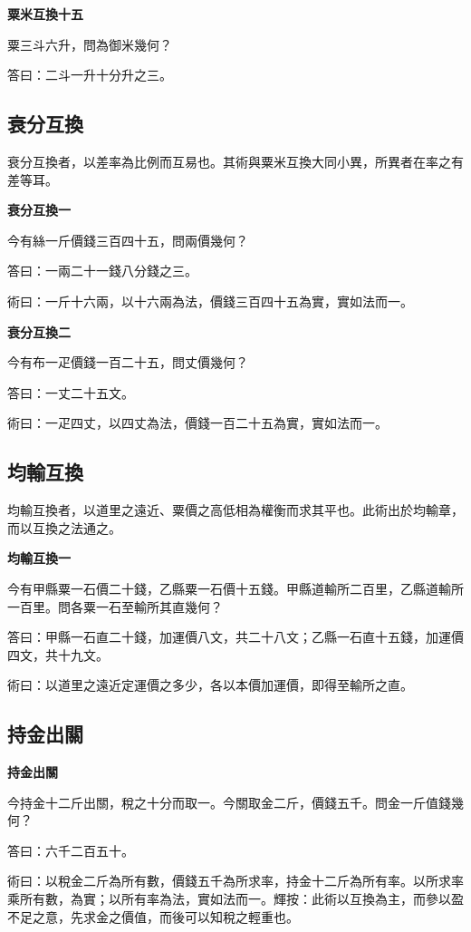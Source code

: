 \documentclass[11pt,a4paper]{article}
\newenvironment{problemenv}[1]{%
  \medskip\noindent\textbf{#1}\par\nopagebreak\smallskip
}{\medskip}
\begin{document}
\begin{problemenv}{粟米互換十五}
粟三斗六升，問為御米幾何？

\textsf{答曰：}二斗一升十分升之三。
\end{problemenv}

\subsection{衰分互換}

衰分互換者，以差率為比例而互易也。其術與粟米互換大同小異，所異者在率之有差等耳。

\begin{problemenv}{衰分互換一}
今有絲一斤價錢三百四十五，問兩價幾何？

\textsf{答曰：}一兩二十一錢八分錢之三。

\textsf{術曰：}一斤十六兩，以十六兩為法，價錢三百四十五為實，實如法而一。
\end{problemenv}

\begin{problemenv}{衰分互換二}
今有布一疋價錢一百二十五，問丈價幾何？

\textsf{答曰：}一丈二十五文。

\textsf{術曰：}一疋四丈，以四丈為法，價錢一百二十五為實，實如法而一。
\end{problemenv}

\subsection{均輸互換}

均輸互換者，以道里之遠近、粟價之高低相為權衡而求其平也。此術出於均輸章，而以互換之法通之。

\begin{problemenv}{均輸互換一}
今有甲縣粟一石價二十錢，乙縣粟一石價十五錢。甲縣道輸所二百里，乙縣道輸所一百里。問各粟一石至輸所其直幾何？

\textsf{答曰：}甲縣一石直二十錢，加運價八文，共二十八文；乙縣一石直十五錢，加運價四文，共十九文。

\textsf{術曰：}以道里之遠近定運價之多少，各以本價加運價，即得至輸所之直。
\end{problemenv}

\subsection{持金出關}

\begin{problemenv}{持金出關}
今持金十二斤出關，稅之十分而取一。今關取金二斤，價錢五千。問金一斤值錢幾何？

\textsf{答曰：}六千二百五十。

\textsf{術曰：}以稅金二斤為所有數，價錢五千為所求率，持金十二斤為所有率。以所求率乘所有數，為實；以所有率為法，實如法而一。輝按：此術以互換為主，而參以盈不足之意，先求金之價值，而後可以知稅之輕重也。
\end{problemenv}
\end{document}
